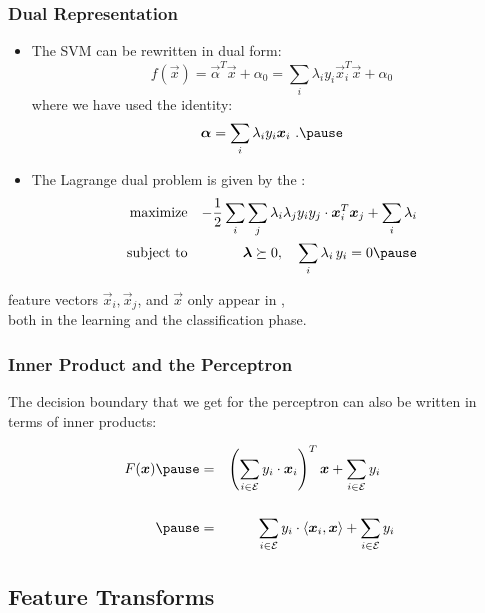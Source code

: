 \begin{frame}
	\frametitle{Dual Representation}

	\begin{itemize}
		\item The SVM  can be rewritten in dual form:
		      {\small
		      \begin{displaymath}
			      f(\vec x) =
			      \vec \alpha^T\vec x +\alpha_0 =
			      \sum_i \lambda_i y_i \vec x_i^T \vec x + \alpha_0
		      \end{displaymath}
		      }
		      where we have used the identity:
		      {\small
		      \begin{displaymath}
			      \vec \alpha = \sum_i \lambda_i y_i \vec x_i~. \pause
		      \end{displaymath}
		      }
		\item The Lagrange dual problem is given by the :
		      {\small
		      \begin{eqnarray*}
			      \mbox{maximize}   & & -\frac{1}{2} \sum_i \sum_j \lambda_i \lambda_j y_i y_j \cdot \vec x_i^T\vec x_j + \sum_i \lambda_i \\
			      \mbox{subject to} & & \vec{\lambda}\succeq 0, \quad \sum_{i} \lambda_i \, y_i = 0 \pause
		      \end{eqnarray*}
		      }
	\end{itemize}

	feature vectors $\vec x_i, \vec x_j$, and $\vec x$ only appear in , \\
	both in the learning and the classification phase.
\end{frame}


\begin{frame}
	\frametitle{Inner Product and the Perceptron}

	The decision boundary that we get for the perceptron can also be written in terms of inner products:

	\begin{eqnarray*}
		F(\vec x) \pause
		&=& \left (\sum_{i\in \cal E} y_i\cdot \vec x_i \right)^T \vec x + \sum_{i\in \cal E} y_i \quad \\[.5cm] \pause
		&=& \sum_{i\in \cal E} y_i\cdot \langle \vec x_i, \vec x\rangle + \sum_{i\in \cal E} y_i
	\end{eqnarray*}
\end{frame}


\subsection{Feature Transforms}


